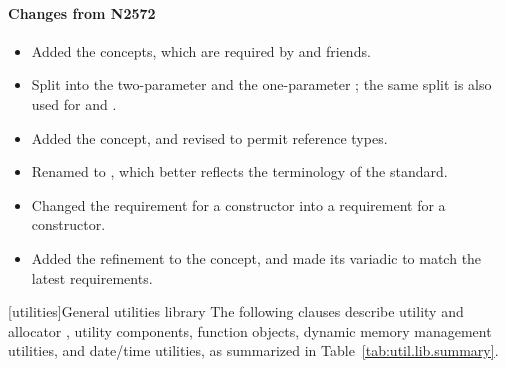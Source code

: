 \documentclass[american,twoside]{book}
\begin{document}
\begin{titlepage}

\paragraph*{Changes from N2572}
\begin{itemize}
\item Added the  concepts, which are required by
   and friends.
\item Split  into the two-parameter
   and the one-parameter ;
  the same split is also used for  and
  .
\item Added the  concept, and revised
   to permit reference types.
\item Renamed  to ,
  which better reflects the terminology of the standard.
\item Changed the  requirement for a  constructor into a requirement for a 
  constructor.
\item Added the  refinement to the
   concept, and made its  variadic
  to match the latest  requirements.
\end{itemize}

\end{titlepage}

\pagestyle{fancy}
\fancyhead[LE,RO]{\textbf{\rightmark}}
\fancyhead[RE]{\textbf{\leftmark\hspace{1em}\thepage}}
\fancyhead[LO]{\textbf{\thepage\hspace{1em}\leftmark}}


\renewcommand{\sectionmark}[1]{\markright{\thesection\hspace{1em}#1}}
\renewcommand{\chaptermark}[1]{\markboth{#1}{}}

\setcounter{chapter}{19}
[utilities]{General utilities library}
\setcounter{Paras}{1}
\textcolor{black}{\pnum}
The following clauses describe utility and allocator , utility
components,  function objects, dynamic
memory management utilities, and date/time utilities, as summarized in
Table~\ref{tab:util.lib.summary}.
\end{document}
